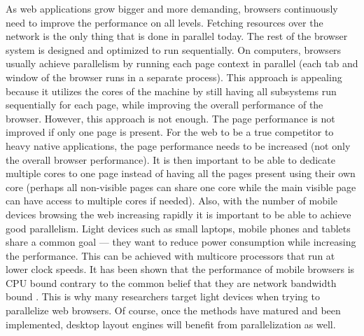 \documentclass[a4paper,11pt]{kth-mag}
\begin{document}
        As \gls{web} applications grow bigger and more demanding, \glspl{browser} continuously need to improve the performance on all levels.
        Fetching resources over the network is the only thing that is done in parallel today.
        The rest of the \gls{browser} system is designed and optimized to run sequentially.
        On computers, \glspl{browser} usually achieve parallelism by running each page context in parallel (each tab and window of the \gls{browser} runs in a separate process).
        This approach is appealing because it utilizes the cores of the machine by still having all subsystems run sequentially for each page, while improving the overall performance of the \gls{browser}.
        However, this approach is not enough.
        The page performance is not improved if only one page is present.
        For the \gls{web} to be a true competitor to heavy native applications, the page performance needs to be increased (not only the overall \gls{browser} performance).
        It is then important to be able to dedicate multiple cores to one page instead of having all the pages present using their own core (perhaps all non-visible pages can share one core while the main visible page can have access to multiple cores if needed).
        Also, with the number of mobile devices browsing the \gls{web} increasing rapidly it is important to be able to achieve good parallelism.
        Light devices such as small laptops, mobile phones and tablets share a common goal --- they want to reduce power consumption while increasing the performance.
        This can be achieved with multicore processors that run at lower clock speeds.
        It has been shown that the performance of mobile \glspl{browser} is \gls{CPU} bound contrary to the common belief that they are network bandwidth bound \cite{parallelizing_the_web_browser}.
        This is why many researchers target light devices when trying to parallelize \gls{web} \glspl{browser}.
        Of course, once the methods have matured and been implemented, desktop layout engines will benefit from parallelization as well.
\end{document}
